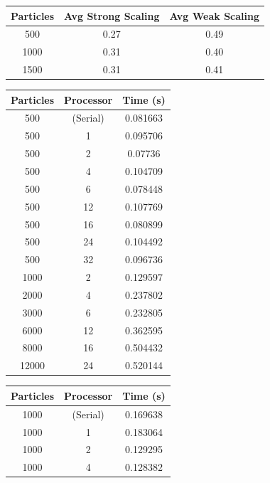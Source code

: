 \documentclass[12pt]{article}
\begin{document}
\begin{table}[h]

\begin{tabular}{||c c c||} 
 \hline
 Particles & Avg Strong Scaling & Avg Weak Scaling  \\ [0.5ex] 
 \hline\hline 
 500 & 0.27 & 0.49 \\
 \hline 
 1000 & 0.31 & 0.40 \\
 \hline 
 1500 & 0.31 & 0.41  \\
 \hline
\end{tabular}

\end{table}
\begin{table}[h]

 \begin{tabular}{||c c c||} 
 \hline
 Particles & Processor & Time (s)  \\ [0.5ex] 
 \hline\hline
 500 & (Serial) & 0.081663 \\
 \hline 
 500 & 1 & 0.095706  \\
 \hline
  500 & 2 & 0.07736  \\
 \hline
  500 & 4 & 0.104709  \\
 \hline
  500 & 6 & 0.078448  \\
 \hline
  500 & 12 & 0.107769  \\
 \hline
  500 & 16 & 0.080899  \\
 \hline
  500 & 24 & 0.104492   \\
 \hline
  500 & 32 & 0.096736  \\
 \hline
  1000 & 2 & 0.129597  \\
 \hline
  2000 & 4 & 0.237802  \\
 \hline
  3000 & 6 & 0.232805  \\
 \hline
  6000 & 12 & 0.362595  \\
 \hline
  8000 & 16 & 0.504432  \\
 \hline
  12000 & 24 & 0.520144  \\
 \hline
\end{tabular}
\begin{tabular}{||c c c||} 
 \hline
 Particles & Processor & Time (s)  \\ [0.5ex] 
 \hline\hline 
 1000 & (Serial) & 0.169638 \\
 \hline 
 1000 & 1 & 0.183064 \\
 \hline 
 1000 & 2 & 0.129295 \\
 \hline  
 1000 & 4 & 0.128382 \\

\end{tabular}
\end{table}
\end{document}
